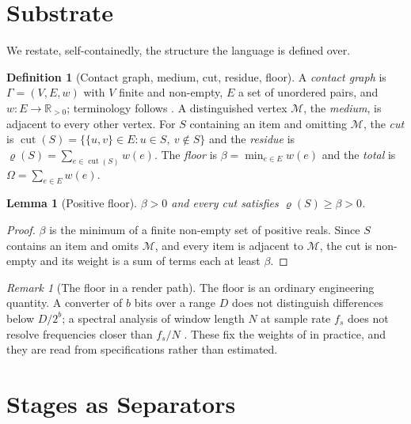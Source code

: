 \documentclass[11pt,twocolumn,a4paper]{article}
\newtheorem{lemma}[theorem]{Lemma}
\theoremstyle{definition}
\newtheorem{definition}[theorem]{Definition}
\theoremstyle{remark}
\newtheorem{remark}[theorem]{Remark}
\newcommand{\R}{\mathbb{R}}
\newcommand{\Rpos}{\R_{>0}}
\newcommand{\flo}{\beta}
\newcommand{\Om}{\Omega}
\newcommand{\Gph}{\Gamma}
\newcommand{\wt}{w}
\newcommand{\cut}{\operatorname{cut}}
\newcommand{\res}{\varrho}
\newcommand{\med}{\mathcal{M}}
\begin{document}
\section{Substrate}
\label{sec:substrate}

We restate, self-containedly, the structure the language is defined over.

\begin{definition}[Contact graph, medium, cut, residue, floor]
\label{def:substrate}
A \emph{contact graph} is $\Gph=(V,E,\wt)$ with $V$ finite and non-empty, $E$ a
set of unordered pairs, and $\wt\colon E\to\Rpos$; terminology follows
\citet{diestel2010graph}. A distinguished vertex $\med$, the \emph{medium}, is
adjacent to every other vertex. For $S$ containing an item and omitting $\med$,
the \emph{cut} is $\cut(S)=\{\{u,v\}\in E: u\in S,\ v\notin S\}$ and the
\emph{residue} is $\res(S)=\sum_{e\in\cut(S)}\wt(e)$. The \emph{floor} is
$\flo=\min_{e\in E}\wt(e)$ and the \emph{total} is $\Om=\sum_{e\in E}\wt(e)$.
\end{definition}

\begin{lemma}[Positive floor]
\label{lem:floor}
$\flo>0$ and every cut satisfies $\res(S)\ge\flo>0$.
\end{lemma}

\begin{proof}
$\flo$ is the minimum of a finite non-empty set of positive reals. Since $S$
contains an item and omits $\med$, and every item is adjacent to $\med$, the cut
is non-empty and its weight is a sum of terms each at least $\flo$.
\end{proof}

\begin{remark}[The floor in a render path]
\label{rem:audio-floor}
The floor is an ordinary engineering quantity. A converter of $b$ bits over a
range $D$ does not distinguish differences below $D/2^{b}$; a spectral analysis of
window length $N$ at sample rate $f_s$ does not resolve frequencies closer than
$f_s/N$ \citep{harris1978use}. These fix the weights of  in
practice, and they are read from specifications rather than estimated.
\end{remark}

\section{Stages as Separators}
\label{sec:separators}
\end{document}
